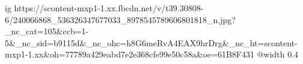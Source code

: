 
 
 
 
 

\ifcmt
  ig https://scontent-mxp1-1.xx.fbcdn.net/v/t39.30808-6/240066868_536326347677033_8978545789606801818_n.jpg?_nc_cat=105&ccb=1-5&_nc_sid=b9115d&_nc_ohc=h8G6meRvA4EAX9hrDrg&_nc_ht=scontent-mxp1-1.xx&oh=77789a429eabd7e2e368cfe99e50c58a&oe=61B8F431
  @width 0.4
\fi

